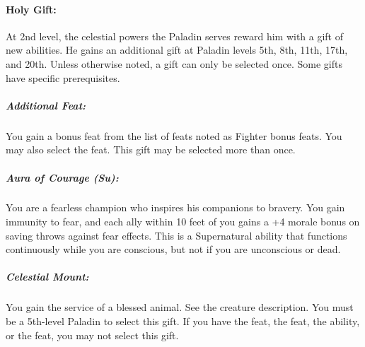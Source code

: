 % 

\paragraph{Holy Gift:}
At 2nd level, the celestial powers the Paladin serves reward him with a gift of new abilities. He gains an additional gift at Paladin levels 5th, 8th, 11th, 17th, and 20th. Unless otherwise noted, a gift can only be selected once. Some gifts have specific prerequisites.

\subparagraph{Additional Feat:}
You gain a bonus feat from the list of feats noted as Fighter bonus feats. You may also select the  feat.
This gift may be selected more than once.

\subparagraph{Aura of Courage (Su):}
You are a fearless champion who inspires his companions to bravery.
You gain immunity to fear, and each ally within 10 feet of you gains a +4 morale bonus on saving throws against fear effects.
This is a Supernatural ability that functions continuously while you are conscious, but not if you are unconscious or dead.

\subparagraph[Celestial Mount]{Celestial Mount:}
\label{sec:CelestialMountListing}
You gain the service of a blessed animal. See the  creature description. You must be a 5th-level Paladin to select this gift. If you have the  feat, the  feat, the  ability, or the  feat, you may not select this gift.

